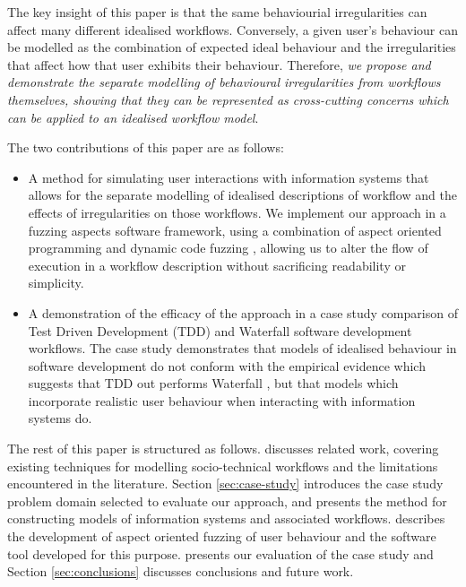 \documentclass{llncs}
\begin{document}
The key insight of this paper is that the same behaviourial irregularities can affect many different idealised
workflows.  Conversely, a given user's behaviour can be modelled as the combination of expected ideal behaviour and the
irregularities that affect how that user exhibits their behaviour.  Therefore, \emph{we propose and demonstrate the
  separate modelling of behavioural irregularities from workflows themselves, showing that they can be represented as
  cross-cutting concerns which can be applied to an idealised workflow model}.

The two contributions of this paper are as follows:

\begin{itemize}

\item A method for simulating user interactions with information systems that allows for the separate modelling of
  idealised descriptions of workflow and the effects of irregularities on those workflows.  We implement our approach in
  a fuzzing aspects software framework, using a combination of aspect oriented programming \cite{filman01aspect} and
  dynamic code fuzzing \citep{takanen08fuzzing}, allowing us to alter the flow of execution in a workflow description
  without sacrificing readability or simplicity.

\item A demonstration of the efficacy of the approach in a case study comparison of Test Driven Development (TDD) and
  Waterfall software development workflows.  The case study demonstrates that models of idealised behaviour in software
  development do not conform with the empirical evidence which suggests that TDD out performs Waterfall
  \citep{Bhat2006TestDrivenDevelopment,George2004TestDrivenDevelopment,Huang2009EmpiricalTestFirstProgramming}, but that
  models which incorporate realistic user behaviour when interacting with information systems do.

\end{itemize}

The rest of this paper is structured as follows.   discusses related work, covering existing
techniques for modelling socio-technical workflows and the limitations encountered in the literature.  Section
\ref{sec:case-study} introduces the case study problem domain selected to evaluate our approach, and presents the method
for constructing models of information systems and associated workflows.  describes the development of
aspect oriented fuzzing of user behaviour and the software tool developed for this purpose.  
presents our evaluation of the case study and Section \ref{sec:conclusions} discusses conclusions and future work.
\end{document}
